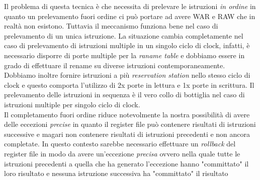 Il problema di questa tecnica è che necessita di prelevare le istruzioni \emph{in ordine} in quanto un prelevamento fuori ordine ci può portare ad avere WAR e RAW che in realtà non esistono. Tuttavia il meccanismo funziona bene nel caso di prelevamento di un unica istruzione. La situazione cambia completamente nel caso di prelevamento di istruzioni multiple in un singolo ciclo di clock, infatti, è necessario disporre di porte multiple  per la \emph{raname table} e dobbiamo essere in grado di effettuare il rename su diverse istruzioni contemporaneamente. Dobbiamo inoltre fornire istruzioni a più \emph{reservation station} nello stesso ciclo di clock e questo comporta l'utilizzo di 2x porte in lettura e 1x porte in scrittura. Il prelevamento delle istruzioni in sequenza è il vero collo di bottiglia nel caso di istruzioni multiple per singolo ciclo di clock.\\
Il completamento fuori ordine riduce notevolmente la nostra possibilità di avere delle eccezioni \emph{precise} in quanto il register file può contenere risultati di istruzioni successive e magari non contenere risultati di istruzioni precedenti e non ancora completate.
In questo contesto sarebbe necessario effettuare un \emph{rollback} del register file in modo da avere un'eccezione \emph{precisa} ovvero nella quale tutte le istruzioni precedenti a quella che ha generato l'eccezione hanno "committato" il loro risultato e nessuna istruzione successiva ha "committato" il risultato

